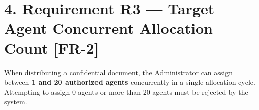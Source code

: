 \documentclass[11pt,a4paper]{article}
\begin{document}
\vspace{2em}

\section*{4. Requirement R3 --- Target Agent Concurrent Allocation Count [FR-2]}
When distributing a confidential document, the Administrator can assign between \textbf{1 and 20 authorized agents} concurrently in a single allocation cycle. Attempting to assign 0 agents or more than 20 agents must be rejected by the system.

\vspace{0.5em}
\end{document}

